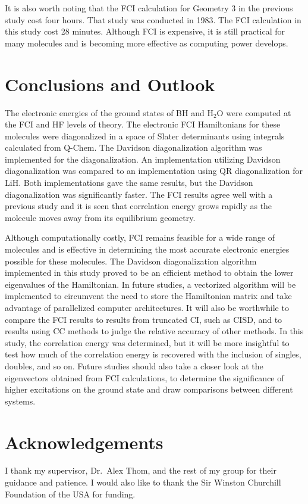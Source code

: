 \documentclass[final,3p,times,twocolumn]{elsarticle}
\begin{document}
It is also worth noting that the FCI calculation for Geometry 3 in the previous study cost four hours.\cite{handy-1983} That study was conducted in 1983. The FCI calculation in this study cost 28 minutes. Although FCI is expensive, it is still practical for many molecules and is becoming more effective as computing power develops.


\section{Conclusions and Outlook}
\label{sect:Concl}
The electronic energies of the ground states of BH and H$_2$O were computed at the FCI and HF levels of theory. The electronic FCI Hamiltonians for these molecules were diagonalized in a space of Slater determinants using integrals calculated from Q-Chem. The Davidson diagonalization algorithm was implemented for the diagonalization. An implementation utilizing Davidson diagonalization was compared to an implementation using QR diagonalization for LiH. Both implementations gave the same results, but the Davidson diagonalization was significantly faster. The FCI results agree well with a previous study\cite{handy-1983} and it is seen that correlation energy grows rapidly as the molecule moves away from its equilibrium geometry.

Although computationally costly, FCI remains feasible for a wide range of molecules and is effective in determining the most accurate electronic energies possible for these molecules. The Davidson diagonalization algorithm implemented in this study proved to be an efficient method to obtain the lower eigenvalues of the Hamiltonian. In future studies, a vectorized algorithm will be implemented to circumvent the need to store the Hamiltonian matrix and take advantage of parallelized computer architectures.\cite{handy-1983} It will also be worthwhile to compare the FCI results to results from truncated CI, such as CISD, and to results using CC methods to judge the relative accuracy of other methods. In this study, the correlation energy was determined, but it will be more insightful to test how much of the correlation energy is recovered with the inclusion of singles, doubles, and so on. Future studies should also take a closer look at the eigenvectors obtained from FCI calculations, to determine the significance of higher excitations on the ground state and draw comparisons between different systems.

\section*{Acknowledgements}
I thank my supervisor, Dr.\ Alex Thom, and the rest of my group for their guidance and patience. I would also like to thank the Sir Winston Churchill Foundation of the USA for funding.
\end{document}

